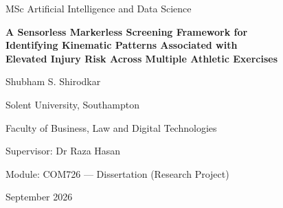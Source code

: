 \begin{titlepage}
\centering
\vspace*{2cm}
{\large MSc Artificial Intelligence and Data Science\par}
\vspace{2.5cm}
{\Large\bfseries A Sensorless Markerless Screening Framework for\\
Identifying Kinematic Patterns Associated with\\
Elevated Injury Risk Across Multiple Athletic Exercises\par}
\vspace{2.5cm}
{\large Shubham S. Shirodkar\par}   %
\vspace{1cm}
\vspace{1.5cm}
{\large Solent University, Southampton\par}
\vspace{0.5cm}
{\large Faculty of Business, Law and Digital Technologies\par}
\vspace{1.5cm}
{\large Supervisor: Dr Raza Hasan\par}
\vspace{0.4cm}
{\large Module: COM726 --- Dissertation (Research Project)\par}
\vspace{0.4cm}
{\large September 2026\par}
\vfill
\end{titlepage}
